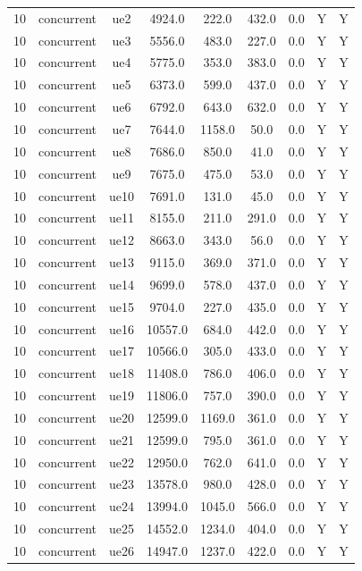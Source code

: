 \begin{table}[ht]
\begin{tabular}{|c|c|c|c|c|c|c|c|c|}
10 & concurrent & ue2 & 4924.0 & 222.0 & 432.0 & 0.0 & Y & Y \\
10 & concurrent & ue3 & 5556.0 & 483.0 & 227.0 & 0.0 & Y & Y \\
10 & concurrent & ue4 & 5775.0 & 353.0 & 383.0 & 0.0 & Y & Y \\
10 & concurrent & ue5 & 6373.0 & 599.0 & 437.0 & 0.0 & Y & Y \\
10 & concurrent & ue6 & 6792.0 & 643.0 & 632.0 & 0.0 & Y & Y \\
10 & concurrent & ue7 & 7644.0 & 1158.0 & 50.0 & 0.0 & Y & Y \\
10 & concurrent & ue8 & 7686.0 & 850.0 & 41.0 & 0.0 & Y & Y \\
10 & concurrent & ue9 & 7675.0 & 475.0 & 53.0 & 0.0 & Y & Y \\
10 & concurrent & ue10 & 7691.0 & 131.0 & 45.0 & 0.0 & Y & Y \\
10 & concurrent & ue11 & 8155.0 & 211.0 & 291.0 & 0.0 & Y & Y \\
10 & concurrent & ue12 & 8663.0 & 343.0 & 56.0 & 0.0 & Y & Y \\
10 & concurrent & ue13 & 9115.0 & 369.0 & 371.0 & 0.0 & Y & Y \\
10 & concurrent & ue14 & 9699.0 & 578.0 & 437.0 & 0.0 & Y & Y \\
10 & concurrent & ue15 & 9704.0 & 227.0 & 435.0 & 0.0 & Y & Y \\
10 & concurrent & ue16 & 10557.0 & 684.0 & 442.0 & 0.0 & Y & Y \\
10 & concurrent & ue17 & 10566.0 & 305.0 & 433.0 & 0.0 & Y & Y \\
10 & concurrent & ue18 & 11408.0 & 786.0 & 406.0 & 0.0 & Y & Y \\
10 & concurrent & ue19 & 11806.0 & 757.0 & 390.0 & 0.0 & Y & Y \\
10 & concurrent & ue20 & 12599.0 & 1169.0 & 361.0 & 0.0 & Y & Y \\
10 & concurrent & ue21 & 12599.0 & 795.0 & 361.0 & 0.0 & Y & Y \\
10 & concurrent & ue22 & 12950.0 & 762.0 & 641.0 & 0.0 & Y & Y \\
10 & concurrent & ue23 & 13578.0 & 980.0 & 428.0 & 0.0 & Y & Y \\
10 & concurrent & ue24 & 13994.0 & 1045.0 & 566.0 & 0.0 & Y & Y \\
10 & concurrent & ue25 & 14552.0 & 1234.0 & 404.0 & 0.0 & Y & Y \\
10 & concurrent & ue26 & 14947.0 & 1237.0 & 422.0 & 0.0 & Y & Y \\

\end{tabular}
\end{table}
